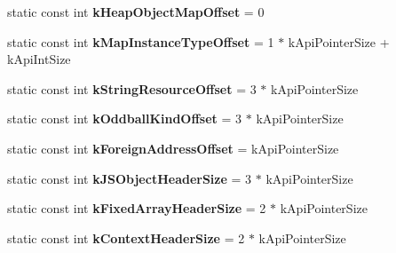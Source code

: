 \begin{DoxyCompactItemize}
\item 
\hypertarget{classv8_1_1internal_1_1_internals_a0902a596b5656b4592157eaacc020512}{}static const int {\bfseries k\+Heap\+Object\+Map\+Offset} = 0\label{classv8_1_1internal_1_1_internals_a0902a596b5656b4592157eaacc020512}

\item 
\hypertarget{classv8_1_1internal_1_1_internals_a39ea290dfaa9de300bd79aa73a874a88}{}static const int {\bfseries k\+Map\+Instance\+Type\+Offset} = 1 $\ast$ k\+Api\+Pointer\+Size + k\+Api\+Int\+Size\label{classv8_1_1internal_1_1_internals_a39ea290dfaa9de300bd79aa73a874a88}

\item 
\hypertarget{classv8_1_1internal_1_1_internals_a8c2b35069864f567ca0c571310dd90a1}{}static const int {\bfseries k\+String\+Resource\+Offset} = 3 $\ast$ k\+Api\+Pointer\+Size\label{classv8_1_1internal_1_1_internals_a8c2b35069864f567ca0c571310dd90a1}

\item 
\hypertarget{classv8_1_1internal_1_1_internals_a98685d6861a07139720cd296f94f2b73}{}static const int {\bfseries k\+Oddball\+Kind\+Offset} = 3 $\ast$ k\+Api\+Pointer\+Size\label{classv8_1_1internal_1_1_internals_a98685d6861a07139720cd296f94f2b73}

\item 
\hypertarget{classv8_1_1internal_1_1_internals_ad4134449ee39b95e5ac035996aa7d66b}{}static const int {\bfseries k\+Foreign\+Address\+Offset} = k\+Api\+Pointer\+Size\label{classv8_1_1internal_1_1_internals_ad4134449ee39b95e5ac035996aa7d66b}

\item 
\hypertarget{classv8_1_1internal_1_1_internals_af8faf3ff3271d26bafa6ca0ea87e2a57}{}static const int {\bfseries k\+J\+S\+Object\+Header\+Size} = 3 $\ast$ k\+Api\+Pointer\+Size\label{classv8_1_1internal_1_1_internals_af8faf3ff3271d26bafa6ca0ea87e2a57}

\item 
\hypertarget{classv8_1_1internal_1_1_internals_a715ca62a5ddceac28d43c470db067675}{}static const int {\bfseries k\+Fixed\+Array\+Header\+Size} = 2 $\ast$ k\+Api\+Pointer\+Size\label{classv8_1_1internal_1_1_internals_a715ca62a5ddceac28d43c470db067675}

\item 
\hypertarget{classv8_1_1internal_1_1_internals_aa5187d7653158ef851c53594e6e63851}{}static const int {\bfseries k\+Context\+Header\+Size} = 2 $\ast$ k\+Api\+Pointer\+Size\label{classv8_1_1internal_1_1_internals_aa5187d7653158ef851c53594e6e63851}


\end{DoxyCompactItemize}
